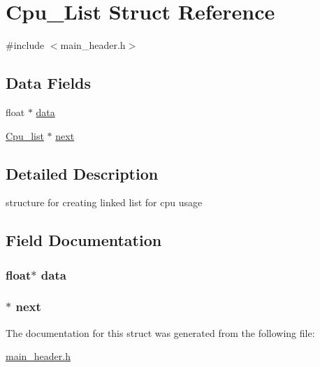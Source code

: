 \hypertarget{struct_cpu___list}{}\section{Cpu\+\_\+\+List Struct Reference}
\label{struct_cpu___list}


{\ttfamily \#include $<$main\+\_\+header.\+h$>$}

\subsection*{Data Fields}
\begin{DoxyCompactItemize}
\item 
float $\ast$ \hyperlink{struct_cpu___list_a57ba9c584cf7756552b7d4370e93395f}{data}
\item 
\hyperlink{main__header_8h_aff2a7bcc7cd598cf43d7ae15bf1a6594}{Cpu\+\_\+list} $\ast$ \hyperlink{struct_cpu___list_af0e00c9fbb15f23155e780956cf8b39b}{next}
\end{DoxyCompactItemize}


\subsection{Detailed Description}
structure for creating linked list for cpu usage 

\subsection{Field Documentation}
\subsubsection[{\texorpdfstring{data}{data}}]{\setlength{\rightskip}{0pt plus 5cm}float$\ast$ data}\hypertarget{struct_cpu___list_a57ba9c584cf7756552b7d4370e93395f}{}\label{struct_cpu___list_a57ba9c584cf7756552b7d4370e93395f}
\subsubsection[{\texorpdfstring{next}{next}}]{$\ast$ next}\hypertarget{struct_cpu___list_af0e00c9fbb15f23155e780956cf8b39b}{}\label{struct_cpu___list_af0e00c9fbb15f23155e780956cf8b39b}


The documentation for this struct was generated from the following file\+:\begin{DoxyCompactItemize}
\item 
\hyperlink{main__header_8h}{main\+\_\+header.\+h}\end{DoxyCompactItemize}
